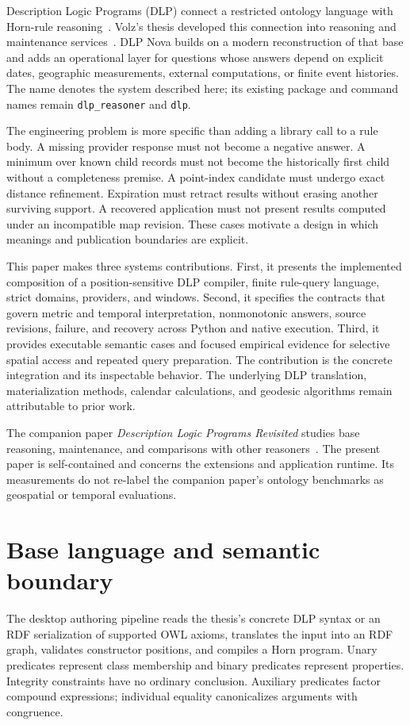 \documentclass{article}
\newcommand{\code}[1]{\texttt{#1}}
\begin{document}
Description Logic Programs (DLP) connect a restricted ontology language with
Horn-rule reasoning~\cite{grosof2003}. Volz's thesis developed this connection
into reasoning and maintenance services~\cite{volz2004}. DLP Nova builds on a
modern reconstruction of that base and adds an operational layer for questions
whose answers depend on explicit dates, geographic measurements, external
computations, or finite event histories. The name denotes the system described
here; its existing package and command names remain \code{dlp\_reasoner} and
\code{dlp}.

The engineering problem is more specific than adding a library call to a rule
body. A missing provider response must not become a negative answer. A minimum
over known child records must not become the historically first child without
a completeness premise. A point-index candidate must undergo exact distance
refinement. Expiration must retract results without erasing another surviving
support. A recovered application must not present results computed under an
incompatible map revision. These cases motivate a design in which meanings and
publication boundaries are explicit.

This paper makes three systems contributions. First, it presents the implemented
composition of a position-sensitive DLP compiler, finite rule-query language,
strict domains, providers, and windows. Second, it specifies the contracts that
govern metric and temporal interpretation, nonmonotonic answers, source
revisions, failure, and recovery across Python and native execution. Third, it
provides executable semantic cases and focused empirical evidence for selective
spatial access and repeated query preparation. The contribution is the concrete
integration and its inspectable behavior. The underlying DLP translation,
materialization methods, calendar calculations, and geodesic algorithms remain
attributable to prior work.

The companion paper \emph{Description Logic Programs Revisited} studies base
reasoning, maintenance, and comparisons with other reasoners~\cite{dlprevisited2026}.
The present paper is self-contained and concerns the extensions and application
runtime. Its measurements do not re-label the companion paper's ontology
benchmarks as geospatial or temporal evaluations.

\section{Base language and semantic boundary}
\label{sec:base}
The desktop authoring pipeline reads the thesis's concrete DLP syntax or an RDF
serialization of supported OWL axioms, translates the input into an RDF graph,
validates constructor positions, and compiles a Horn program. Unary predicates
represent class membership and binary predicates represent properties. Integrity
constraints have no ordinary conclusion. Auxiliary predicates factor compound
expressions; individual equality canonicalizes arguments with congruence.
\end{document}
